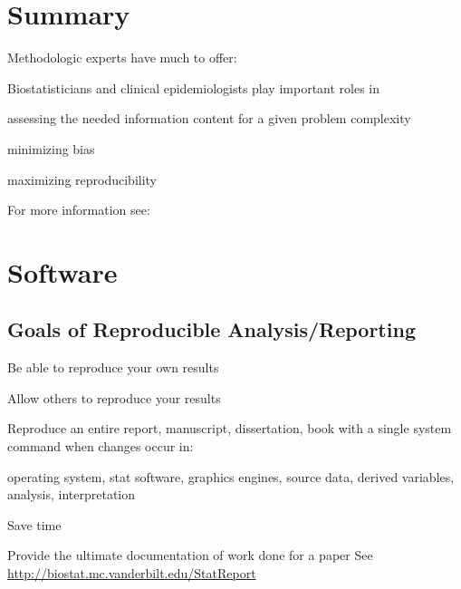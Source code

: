 \section{Summary}
Methodologic experts have much to offer:
\bi
\item Biostatisticians and clinical epidemiologists play important
roles in
 \bi
 \item assessing the needed information content for a given problem
   complexity
 \item minimizing bias
 \item maximizing reproducibility
 \ei
\item For more information see:
\bi
\item {}
\item {}
\item {}
\ei
\ei

\section{Software}
\subsection{Goals of Reproducible Analysis/Reporting}
\bi
\item Be able to reproduce your own results
\item Allow others to reproduce your results

\item Reproduce an entire report, manuscript, dissertation, book with
a single system command when changes occur in:
 \bi
 \item operating system, stat software, graphics engines, source data, derived
 variables, analysis, interpretation
 \ei
\item Save time
\item Provide the ultimate documentation of work done for a paper
\ei
See \url{http://biostat.mc.vanderbilt.edu/StatReport}

